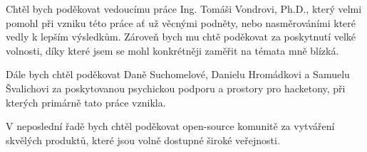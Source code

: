\documentclass[czech,bachelor,unicode]{ctufit-thesis}
\begin{document}
 
\frontmatter\frontmatterinit %


\thispagestyle{empty}\cleardoublepage\maketitle %

\imprintpage %

\tableofcontents %
\listoffigures %
\begingroup
\let\clearpage\relax
\lstlistoflistings %
\endgroup

\begin{acknowledgmentpage}
	Chtěl bych poděkovat vedoucímu práce Ing. Tomáši Vondrovi, Ph.D., který velmi pomohl při vzniku této práce ať už věcnými podněty, nebo nasměrováními které vedly k lepším výsledkům. Zároveň bych mu chtě poděkovat za poskytnutí velké volnosti, díky které jsem se mohl konkrétněji zaměřit na témata mně blízká.
 
    Dále bych chtěl poděkovat Daně Suchomelové, Danielu Hromádkovi a Samuelu Švalichovi za poskytovanou psychickou podporu a prostory pro hacketony, při kterých primárně tato práce vznikla.
 
    V neposlední řadě bych chtěl poděkovat open-source komunitě za vytváření skvělých produktů, které jsou volně dostupné široké veřejnosti. 
\end{acknowledgmentpage} 
\end{document}
